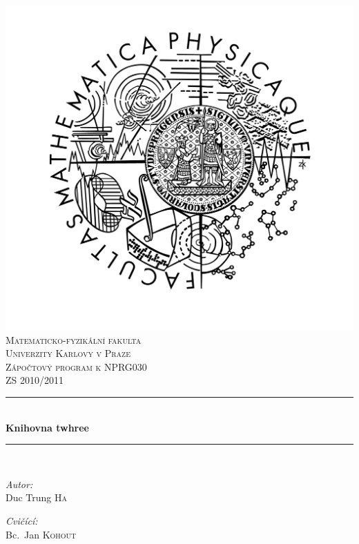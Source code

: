 \documentclass[11pt,a4paper]{article}
\newcommand{\HRule}{\rule{\linewidth}{0.5mm}}
\begin{document}
\begin{titlepage}
\begin{center}
\includegraphics[viewport=180 50 100 100,scale=0.5]{./logo_mff.jpg}\\[1cm]    

\textsc{\LARGE Matematicko-fyzikální fakulta\\[0.1cm]
Univerzity Karlovy v Praze}\\[1.5cm]

\textsc{\Large Zápočtový program k NPRG030\\ ZS 2010/2011}\\[0.5cm]


\HRule \\[0.4cm]
{ \huge \bfseries Knihovna twhree}\\[0.4cm]

\HRule \\[1.5cm]

\begin{minipage}{0.4\textwidth}
\begin{flushleft} \large
\emph{Autor:}\\
Duc Trung \textsc{Ha}
\end{flushleft}
\end{minipage}
\begin{minipage}{0.4\textwidth}
\begin{flushright} \large
\emph{Cvičící:} \\
Bc.~Jan \textsc{Kohout}
\end{flushright}
\end{minipage}


\end{center}
\end{titlepage}
\end{document}
